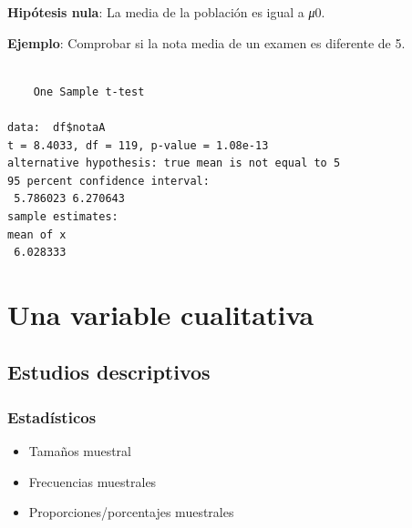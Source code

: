 \documentclass[
  a4paper,
]{scrreport}
\newenvironment{Shaded}{\begin{snugshade}}{\end{snugshade}}
\newcommand{\AttributeTok}[1]{\textcolor[rgb]{0.40,0.45,0.13}{#1}}
\newcommand{\CommentTok}[1]{\textcolor[rgb]{0.37,0.37,0.37}{#1}}
\newcommand{\DecValTok}[1]{\textcolor[rgb]{0.68,0.00,0.00}{#1}}
\newcommand{\FunctionTok}[1]{\textcolor[rgb]{0.28,0.35,0.67}{#1}}
\newcommand{\NormalTok}[1]{\textcolor[rgb]{0.00,0.23,0.31}{#1}}
\newcommand{\SpecialCharTok}[1]{\textcolor[rgb]{0.37,0.37,0.37}{#1}}
\newcommand{\StringTok}[1]{\textcolor[rgb]{0.13,0.47,0.30}{#1}}
\providecommand{\tightlist}{%
  \setlength{\itemsep}{0pt}\setlength{\parskip}{0pt}}\usepackage{longtable,booktabs,array}
\theoremstyle{definition}
\theoremstyle{definition}
\theoremstyle{remark}
\begin{document}
\textbf{Hipótesis nula}: La media de la población es igual a \emph{μ}0.

\textbf{Ejemplo}: Comprobar si la nota media de un examen es diferente
de 5.

\begin{Shaded}
\end{Shaded}

\begin{verbatim}

    One Sample t-test

data:  df$notaA
t = 8.4033, df = 119, p-value = 1.08e-13
alternative hypothesis: true mean is not equal to 5
95 percent confidence interval:
 5.786023 6.270643
sample estimates:
mean of x 
 6.028333 
\end{verbatim}

\section{Una variable cualitativa}\label{una-variable-cualitativa}

\subsection{Estudios descriptivos}\label{estudios-descriptivos-1}

\subsubsection{Estadísticos}\label{estaduxedsticos-1}

\begin{itemize}
\tightlist
\item
  Tamaños muestral
\item
  Frecuencias muestrales
\item
  Proporciones/porcentajes muestrales
\end{itemize}

\begin{Shaded}
\end{Shaded}
\end{document}
